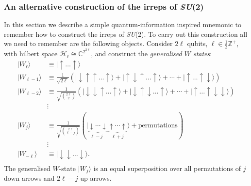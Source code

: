 \documentclass[12pt]{amsart}
\def\su2{\textsl{SU}(2)}
\theoremstyle{definition}
\theoremstyle{remark}
\numberwithin{equation}{section}
\begin{document}
\subsubsection{An alternative construction of the irreps of \su2}
In this section we describe a simple quantum-information inspired mnemonic to remember how to construct the irreps of \su2. To carry out this construction all we need to remember are the following objects. Consider $2\ell$ qubits, $\ell \in \frac12\mathbb{Z}^+$, with hilbert space $\mathcal{H}_\ell \cong \mathbb{C}^{2^{2\ell}}$, and construct the \emph{generalised $W$ states}:
\begin{equation}
	\begin{split}
		|W_{\ell}\rangle &\equiv |\uparrow\dots \uparrow\rangle \\
		|W_{\ell-1}\rangle &\equiv \frac{1}{\sqrt{2\ell }} \left(|\downarrow \uparrow\uparrow\dots \uparrow\rangle + |\uparrow\downarrow\uparrow\dots \uparrow\rangle + \cdots + |\uparrow\dots \uparrow\downarrow\rangle\right) \\
		|W_{\ell-2}\rangle &\equiv \frac{1}{\sqrt{\binom{2\ell }{2}}} \left(|\downarrow\downarrow\uparrow\dots \uparrow\rangle + |\downarrow\uparrow\downarrow\dots \uparrow\rangle + \cdots + |\uparrow\dots \uparrow\downarrow\downarrow\rangle\right)\\
		&\vdots \\
		|W_{j}\rangle &\equiv \frac{1}{\sqrt{\binom{2\ell }{\ell-j}}} \left(|\underbrace{\downarrow\cdots\downarrow}_{\text{$\ell-j$ }} \underbrace{\uparrow\cdots \uparrow}_{\text{$\ell+j$}}\rangle + \text{permutations}\right) \\
		&\vdots \\
		|W_{-\ell}\rangle &\equiv |\downarrow\downarrow\dots \downarrow\rangle. \\
	\end{split}
\end{equation}
The generalised $W$-state $|W_j\rangle$ is an equal superposition over all permutations of $j$ down arrows and $2\ell - j$ up arrows.  
\end{document}
